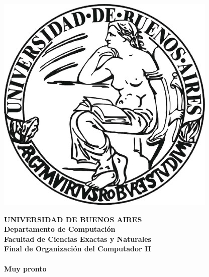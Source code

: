 \documentclass[a4paper]{article}
\begin{document}

\def\Materia{Final de Organizaci\'on del Computador II}
\def\Fecha{Muy pronto}


\thispagestyle{empty}

\begin{center}
	\includegraphics[scale = 0.25]{logo_uba.jpg}
\end{center}

\vspace{5mm}

\begin{center}
	{\textbf{\large UNIVERSIDAD DE BUENOS AIRES}}\\[1.5em]
	{\textbf{\large Departamento de Computaci\'{o}n}}\\[1.5em]
    {\textbf{\large Facultad de Ciencias Exactas y Naturales}}\\
    \vspace{35mm}
    {\LARGE\textbf{\Materia}}\\[1em]    
    \vspace{15mm}
    {\Large \textbf{\Titulo}}\\[1em]
    \vspace{15mm}
    {\textbf{\Large \Fecha}}\\
    \vspace{15mm}
    \textbf{\tablaints}
\end{center}
\end{document}

